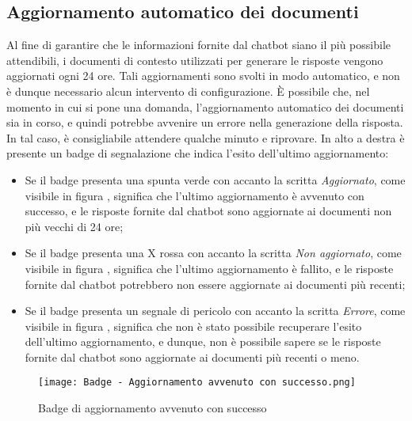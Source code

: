 \subsection{Aggiornamento automatico dei documenti}
\label{subsec:aggiornamento_automatico_documenti}
Al fine di garantire che le informazioni fornite dal chatbot siano il più possibile attendibili, i documenti di contesto utilizzati per generare le risposte vengono aggiornati ogni 24 ore.
Tali aggiornamenti sono svolti in modo automatico, e non è dunque necessario alcun intervento di configurazione.
È possibile che, nel momento in cui si pone una domanda, l'aggiornamento automatico dei documenti sia in corso, e quindi potrebbe avvenire un errore nella generazione della risposta. In tal caso, è consigliabile attendere qualche minuto e riprovare.
In alto a destra è presente un badge di segnalazione che indica l'esito dell'ultimo aggiornamento:
\begin{itemize}
    \item Se il badge presenta una spunta verde con accanto la scritta \emph{Aggiornato}, come visibile in figura , significa che l'ultimo aggiornamento è avvenuto con successo, e le risposte fornite
    dal chatbot sono aggiornate ai documenti non più vecchi di 24 ore;
    \item Se il badge presenta una X rossa con accanto la scritta \emph{Non aggiornato}, come visibile in figura , significa che l'ultimo aggiornamento è fallito, e le risposte fornite dal chatbot potrebbero
    non essere aggiornate ai documenti più recenti;
    \item Se il badge presenta un segnale di pericolo con accanto la scritta \emph{Errore}, come visibile in figura , significa che non è stato possibile recuperare l'esito dell'ultimo aggiornamento, e
    dunque, non è possibile sapere se le risposte fornite dal chatbot sono aggiornate ai documenti più recenti o meno.
\end{itemize}

\newpage

\begin{figure}[h]
    \centering
        \texttt{[image: Badge - Aggiornamento avvenuto con successo.png]}
        \caption{Badge di aggiornamento avvenuto con successo}
        \label{fig:Aggiornamento avvenuto con successo}        
\end{figure}

